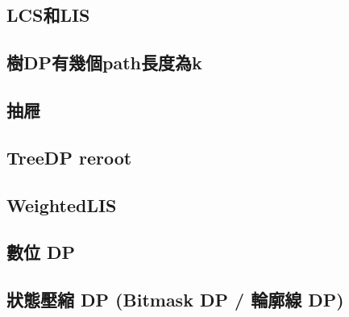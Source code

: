     \subsection{LCS和LIS}
         \columnbreak
    \subsection{樹DP有幾個path長度為k}
        
    \subsection{抽屜}
         \columnbreak
    \subsection{TreeDP reroot}
         \columnbreak
    \subsection{WeightedLIS}
         \columnbreak
    \subsection{數位 DP}
         \columnbreak
    \subsection{狀態壓縮 DP (Bitmask DP / 輪廓線 DP)}
        
\clearpage

%     
    

%         
